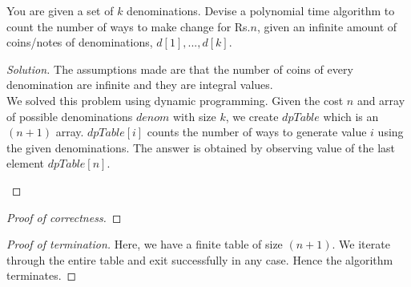 \begin{solution}{4.1}
    \begin{question}
        You are given a set of $k$ denominations. Devise a polynomial time algorithm to count the number of ways to make change for Rs.$n$, given an infinite amount of coins/notes of denominations, $d[1], . . . , d[k]$.
    \end{question}
    \tcblower{}

    \begin{proof}[Solution]
        The assumptions made are that the number of coins of every denomination are infinite and they are integral values.\\
        We solved this problem using dynamic programming. Given the cost $n$ and array of possible denominations $denom$ with size $k$, we create $dpTable$ which is an $(n+1)$ array. $dpTable[i]$ counts the number of ways to generate value $i$ using the given denominations.
        The answer is obtained by observing value of the last element $dpTable[n]$.
    \begin{algorithm}[H]
        \caption{Find total possible combinations of denominations to achieve value of n}
        \begin{algorithmic}
               
             
            \For{$i$ in $[1,n+1)$}
                \For{$j$ in $[1,k+1)$}
                      
                    \EndIf{}
                \EndFor{}
            \EndFor{}
        \EndProcedure{}
        \end{algorithmic}
    \end{algorithm}
    \end{proof}
    \begin{proof}[Proof of correctness]
    \end{proof}
    \begin{proof}[Proof of termination]
        Here, we have a finite table of size $(n+1)$. We iterate through the entire table and exit successfully in any case. Hence the algorithm terminates.
    \end{proof}

\end{solution}
